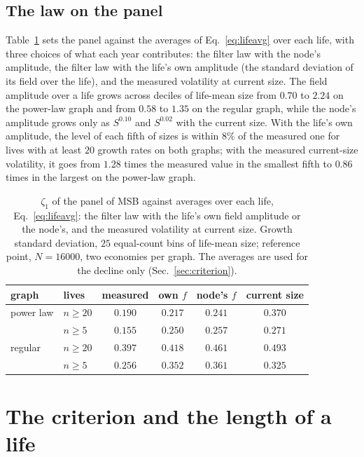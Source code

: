 \documentclass[pre,twocolumn,superscriptaddress,nofootinbib]{revtex4-2}
\begin{document}
\subsection{The law on the panel}

Table~\ref{tab:panel} sets the panel against the averages of Eq.~\eqref{eq:lifeavg} over each life, with three
choices of what each year contributes: the filter law with the node's amplitude, the filter law with the life's own
amplitude (the standard deviation of its field over the life), and the measured volatility at current size.  The
field amplitude over a life grows across deciles of life-mean size from $0.70$ to $2.24$ on the power-law graph and
from $0.58$ to $1.35$ on the regular graph, while the node's amplitude grows only as $S^{0.10}$ and $S^{0.02}$ with the
current size.  With the life's own amplitude, the level of each fifth of sizes is within $8\%$ of the measured one
for lives with at least $20$ growth rates on both graphs; with the measured current-size volatility, it goes from
$1.28$ times the measured value in the smallest fifth to $0.86$ times in the largest on the power-law graph.

\begin{table}[t]
\caption{$\zeta_1$ of the panel of MSB against averages over each life, Eq.~\eqref{eq:lifeavg}: the filter law with
the life's own field amplitude or the node's, and the measured volatility at current size.  Growth standard deviation,
$25$ equal-count bins of life-mean size; reference point, $N=16000$, two economies per graph.  The averages are used
for the decline only (Sec.~\ref{sec:criterion}).}
\label{tab:panel}
\begin{ruledtabular}
\begin{tabular}{llcccc}
graph & lives & measured & own $f$ & node's $f$ & current size\\
\hline
power law & $n\ge20$ & $0.190$ & $0.217$ & $0.241$ & $0.370$\\
 & $n\ge5$ & $0.155$ & $0.250$ & $0.257$ & $0.271$\\
regular & $n\ge20$ & $0.397$ & $0.418$ & $0.461$ & $0.493$\\
 & $n\ge5$ & $0.256$ & $0.352$ & $0.361$ & $0.325$\\
\end{tabular}
\end{ruledtabular}
\end{table}

\section{The criterion and the length of a life}
\label{app:multiscaling}
\end{document}
